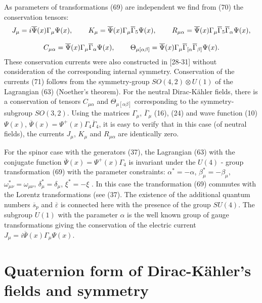 \documentclass[a4paper,12pt]{article}
\begin{document}
As parameters of transformations (69) are independent we find from (70) the
conservation tensors:
\[
J_\mu =i\overline{\Psi }(x)\Gamma _\mu \Psi (x) ,
\hspace{0.3in}K_\mu = \overline{\Psi }(x)\Gamma _\mu
\overline{\Gamma }_5\Psi (x) ,\hspace{0.3in} R_{\mu \alpha
}=\overline{\Psi }(x)\Gamma _\mu \overline{\Gamma }_5\overline{
\Gamma }_\alpha \Psi (x) ,
\]
\vspace{-8mm}
\begin{equation}  \label{71}
\end{equation}
\vspace{-8mm}
\[
C_{\mu \alpha }=\overline{\Psi }(x)\Gamma _\mu \overline{\Gamma
}_\alpha \Psi (x) ,\hspace{0.3in}\Theta _{\mu [\alpha \beta
]}=\overline{\Psi } (x)\Gamma _\mu \overline{\Gamma }_{[\alpha
}\overline{\Gamma }_{\beta ]}\Psi (x) .
\]
These conservation currents were also constructed in [28-31]
without consideration of the corresponding internal symmetry.
Conservation of the currents (71) follows from the symmetry-group
$SO(4,2)\otimes U(1)$ of the Lagrangian (63) (Noether's theorem).
For the neutral Dirac-K\"ahler fields, there is a conservation of
tensors $C_{\mu \alpha }$ and $\Theta _{\mu [\alpha \beta ]}$
corresponding to the symmetry-subgroup $SO(3,2).$ Using the
matrices $\Gamma _\mu $, $\overline{\Gamma }_\mu $ (16), (24) and
wave function (10) $\Psi (x) $, $\overline{\Psi }(x)=\Psi
^{+}(x)\Gamma _4 \overline{\Gamma }_4$, it is easy to verify that
in this case (of neutral fields), the currents $J_\mu $, $K_\mu $
and $R_{\mu \alpha }$ are identically zero.

For the spinor case with the generators (37), the Lagrangian (63)
with the conjugate function $\overline{\Psi }(x)=\Psi
^{+}(x)\Gamma _4$ is invariant under the $U(4)$ - group
transformation (69) with the parameter constraints: $\alpha
^{*}=-\alpha $, $\beta _\mu ^{*}=-\beta _\mu $, $\omega _{\mu \nu
}^{*}=\omega _{\mu \nu }$, $\delta _\mu ^{*}=\delta _\mu $, $\xi
^{*}=-\xi $ . In this case the transformation (69) commutes with
the Lorentz transformations (see (37). The existence of the
additional quantum numbers $ \overline{s}_p$ and
$\overline{\varepsilon }$ is connected here with the presence of
the group $SU(4)$. The subgroup $U(1)$ with the parameter $ \alpha
$ is the well known group of gauge transformations giving the
conservation of the electric current $J_\mu =i\overline{\Psi
}(x)\Gamma _\mu \Psi (x)$.

\section{Quaternion form of Dirac-K\"ahler's fields and
symmetry}
\end{document}
